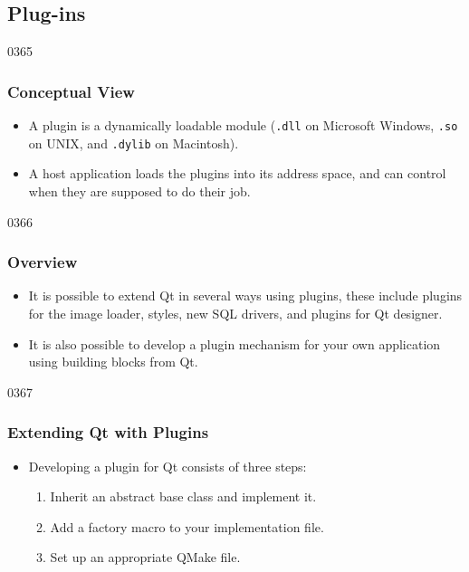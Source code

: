 \subsection{Plug-ins}
\label{plugins}


\begin{slide}{0365}\frametitle{Conceptual View}
\begin{itemize}
\item A plugin is a dynamically loadable module (\texttt{.dll} on Microsoft
  Windows, \texttt{.so} on UNIX, and \texttt{.dylib} on Macintosh).
\item A host application loads the plugins into its address space, and can
  control when they are supposed to do their job.
\end{itemize}
\end{slide}


\begin{slide}[fragile]{0366}
\frametitle{Overview}
\begin{itemize}
\item It is possible to extend Qt in several ways using plugins, these
  include plugins for the image loader, styles, new SQL drivers, and
  plugins for Qt designer.
\item It is also possible to develop a plugin mechanism for your
  own application using building blocks from Qt.
\end{itemize}
\end{slide}

\begin{slide}{0367}\frametitle{Extending Qt with Plugins}
\begin{itemize}
\item Developing a plugin for Qt consists of three steps:
  \begin{enumerate}
  \item Inherit an abstract base class and implement it.
  \item Add a factory macro to your implementation file.
  \item Set up an appropriate QMake file.
\end{enumerate}
\end{itemize}
\end{slide}

